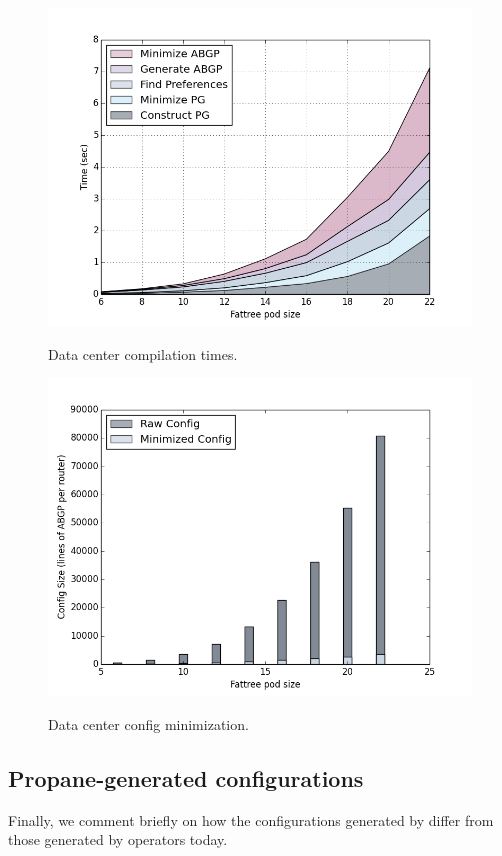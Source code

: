 \begin{figure}[t!]
\centering
\includegraphics[width=\columnwidth]{figures/compilation-times-dc.png}
\label{fig:compilation-times-dc}
\caption{Data center compilation times. }
\end{figure}

\begin{figure}[t!]
\centering
\includegraphics[width=\columnwidth]{figures/config-compression-dc.png}
\label{fig:compilation-compression-dc}
\caption{Data center config minimization.}
\end{figure} 

\subsection{Propane-generated configurations}

Finally, we comment briefly on how the configurations generated by \sysname differ from those generated by operators today. 

